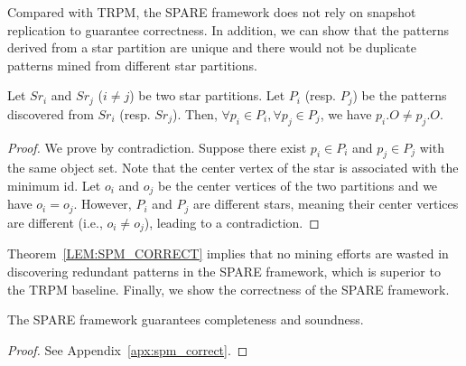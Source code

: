 Compared with TRPM, the SPARE framework does not rely on snapshot replication to guarantee correctness. In addition, we can show that the patterns derived from a star partition are unique and there would not be duplicate patterns mined from different star partitions.
\begin{theorem}
\label{LEM:SPM_CORRECT}
Let $Sr_i$ and $Sr_j$ ($i\neq j$) be two star partitions. Let $P_i$ (resp. $P_j$) be 
the patterns discovered from $Sr_i$ (resp. $Sr_j$). 
Then, $\forall p_i \in P_i, \forall p_j \in P_j$, we have $p_i.O \neq p_j.O$.
\end{theorem}
\begin{proof}
We prove by contradiction. Suppose there exist $p_i \in P_i$ and $p_j \in P_j$ with the same object set. Note that the center vertex of the star is associated with the minimum id. Let $o_i$ and $o_j$ be the center vertices of the two partitions and we have $o_i=o_j$. However, $P_i$ and $P_j$ are different stars, meaning their center vertices are different (i.e., $o_i\neq o_j$), leading to a contradiction. 
\end{proof}

Theorem~\ref{LEM:SPM_CORRECT} implies that no mining efforts are wasted in discovering redundant patterns  
in the SPARE framework, which is superior to the TRPM baseline. Finally, we show the correctness of the SPARE framework.
\begin{theorem}
\label{THM:SPM_CORRECT}
The SPARE framework guarantees completeness and soundness.
\end{theorem}
\begin{proof}
See Appendix~\ref{apx:spm_correct}.
\end{proof}
